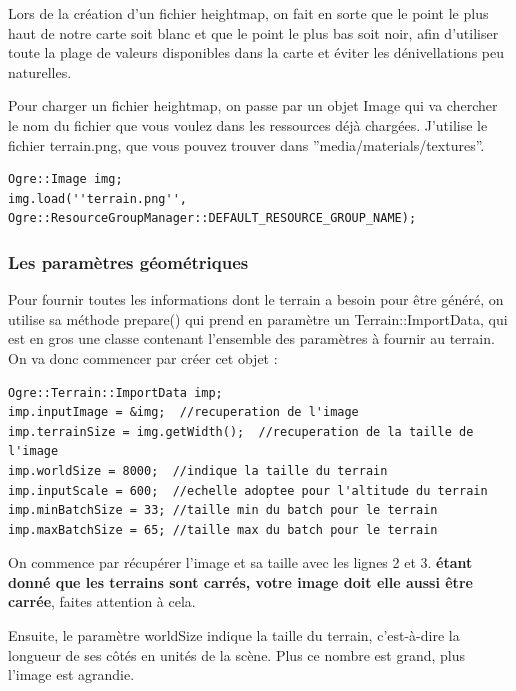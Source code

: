 Lors de la création d'un fichier heightmap, on fait en sorte que le point le plus haut de notre carte soit blanc et que le point le plus bas soit noir, afin d'utiliser toute la plage de valeurs disponibles dans la carte et éviter les dénivellations peu naturelles.

Pour charger un fichier heightmap, on passe par un objet Image qui va chercher le nom du fichier que vous voulez dans les ressources déjà chargées. J'utilise le fichier terrain.png, que vous pouvez trouver dans ''media/materials/textures''.

\begin{lstlisting}[caption={Chargement du fichier heightmap}]
Ogre::Image img;
img.load(''terrain.png'', Ogre::ResourceGroupManager::DEFAULT_RESOURCE_GROUP_NAME);
\end{lstlisting}






\subsubsection{Les paramètres géométriques}


Pour fournir toutes les informations dont le terrain a besoin pour être généré, on utilise sa méthode prepare() qui prend en paramètre un Terrain::ImportData, qui est en gros une classe contenant l'ensemble des paramètres à fournir au terrain. On va donc commencer par créer cet objet :

\begin{lstlisting}[caption={Création de l'objet ImportData pour la définition des paramètres à fournir au terrain}]
Ogre::Terrain::ImportData imp;
imp.inputImage = &img;  //recuperation de l'image
imp.terrainSize = img.getWidth();  //recuperation de la taille de l'image
imp.worldSize = 8000;  //indique la taille du terrain
imp.inputScale = 600;  //echelle adoptee pour l'altitude du terrain
imp.minBatchSize = 33; //taille min du batch pour le terrain
imp.maxBatchSize = 65; //taille max du batch pour le terrain
\end{lstlisting}

On commence par récupérer l'image et sa taille avec les lignes 2 et 3. \textbf{étant donné que les terrains sont carrés, votre image doit elle aussi être carrée}, faites attention à cela.

Ensuite, le paramètre worldSize indique la taille du terrain, c'est-à-dire la longueur de ses côtés en unités de la scène. Plus ce nombre est grand, plus l'image est agrandie.

